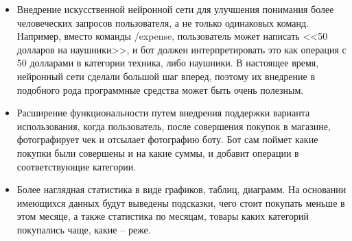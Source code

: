 \begin{itemize}
	\item Внедрение искусственной нейронной сети для улучшения понимания более человеческих запросов пользователя, а не только одинаковых команд. Например, вместо команды /expense, пользователь может написать <<50 долларов на наушники>>, и бот должен интерпретировать это как операция с 50 долларами в категории техника, либо наушники. В настоящее время, нейронный сети сделали большой шаг вперед, поэтому их внедрение в подобного рода программные средства может быть очень полезным.
	\item Расширение функциональности путем внедрения поддержки варианта использования, когда пользователь, после совершения покупок в магазине, фотографирует чек и отсылает фотографию боту. Бот сам поймет какие покупки были совершены и на какие суммы, и добавит операции в соответствующие категории.
	\item Более наглядная статистика в виде графиков, таблиц, диаграмм. На основании имеющихся данных будут выведены подсказки, чего стоит покупать меньше в этом месяце, а также статистика по месяцам, товары каких категорий покупались чаще, какие – реже.
\end{itemize}
